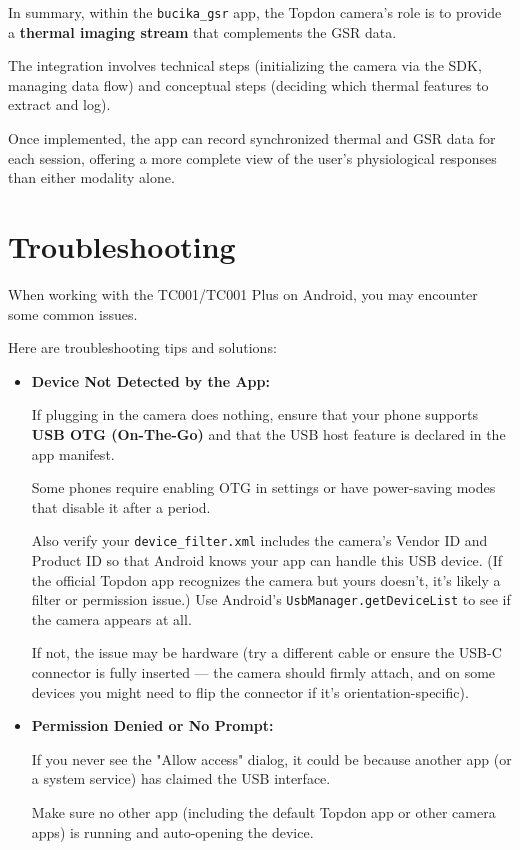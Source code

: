 {In summary, within the \texttt{bucika_gsr} app, the Topdon camera's role is to provide a \textbf{thermal imaging stream}
 that complements the GSR data.

The integration involves technical steps (initializing the camera via the SDK, managing data flow) and conceptual steps (deciding which thermal features to extract and log).

Once implemented, the app can record synchronized thermal and GSR data for each session, offering a more complete view of the user's physiological responses than either modality alone.

\section{Troubleshooting}

When working with the TC001/TC001 Plus on Android, you may encounter some common issues.

Here are troubleshooting tips and solutions: \begin{itemize}
 
\item \textbf{Device Not Detected by the App:}

If plugging in the camera does nothing, ensure that your phone supports \textbf{USB OTG (On-The-Go)}
 and that the USB host feature is declared in the app manifest.

Some phones require enabling OTG in settings or have power-saving modes that disable it after a period.

Also verify your \texttt{device_filter.xml} includes the camera's Vendor ID and Product ID so that Android knows your app can handle this USB device. (If the official Topdon app recognizes the camera but yours doesn't, it's likely a filter or permission issue.) Use Android's \texttt{UsbManager.getDeviceList} to see if the camera appears at all.

If not, the issue may be hardware (try a different cable or ensure the USB-C connector is fully inserted --- the camera should firmly attach, and on some devices you might need to flip the connector if it's orientation-specific).

\item \textbf{Permission Denied or No Prompt:}

If you never see the "Allow access" dialog, it could be because another app (or a system service) has claimed the USB interface.

Make sure no other app (including the default Topdon app or other camera apps) is running and auto-opening the device.


\end{itemize}}
